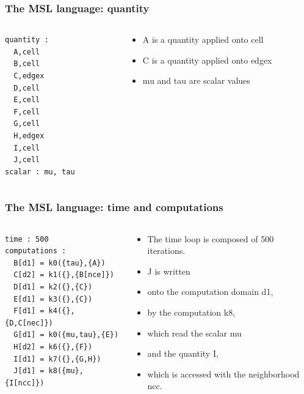 \documentclass{beamer}
\begin{document}
\begin{frame}[fragile]
\frametitle{The MSL language: quantity}
\begin{columns}
\begin{column}{5cm}
\begin{lstlisting}[frame=single]
quantity :
  A,cell
  B,cell
  C,edgex
  D,cell
  E,cell
  F,cell
  G,cell
  H,edgex
  I,cell
  J,cell
scalar : mu, tau
\end{lstlisting}
\end{column}
\begin{column}{6cm}
\begin{itemize}
\item A is a quantity applied onto cell
\item C is a quantity applied onto edgex
\item mu and tau are scalar values
\end{itemize}
\end{column}
\end{columns}
\end{frame}
\begin{frame}[fragile]
\frametitle{The MSL language: time and computations}
\begin{columns}
\begin{column}{6cm}
\begin{lstlisting}[frame=single]
time : 500
computations :
  B[d1] = k0({tau},{A})
  C[d2] = k1({},{B[nce]})
  D[d1] = k2({},{C})
  E[d1] = k3({},{C})
  F[d1] = k4({},{D,C[nec]})
  G[d1] = k0({mu,tau},{E})
  H[d2] = k6({},{F})
  I[d1] = k7({},{G,H})
  J[d1] = k8({mu},{I[ncc]})
\end{lstlisting}
\end{column}
\begin{column}{5cm}
\begin{itemize}
\item The time loop is composed of 500 iterations.
\item J is written
\item onto the computation domain d1,
\item by the computation k8,
\item which read the scalar mu
\item and the quantity I,
\item which is accessed with the neighborhood ncc.
\end{itemize}
\end{column}
\end{columns}
\end{frame}
\end{document}
